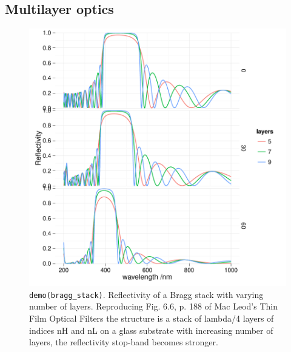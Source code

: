 \documentclass[12pt, a4paper]{article}
\begin{document}
\subsection{Multilayer optics}
%
\begin{figure}[!ht]
\centering
\includegraphics{planar-vignette-bragg_stack}
\caption{\texttt{demo(bragg\_stack)}. Reflectivity of a Bragg stack with varying number of layers. Reproducing Fig. 6.6, p. 188 of Mac Leod's Thin Film Optical Filters the structure is a stack of lambda/4 layers of indices nH and nL on a glass substrate with increasing number of layers, the reflectivity stop-band becomes stronger.}
\label{fig:braggstack}
\end{figure}
\end{document}
